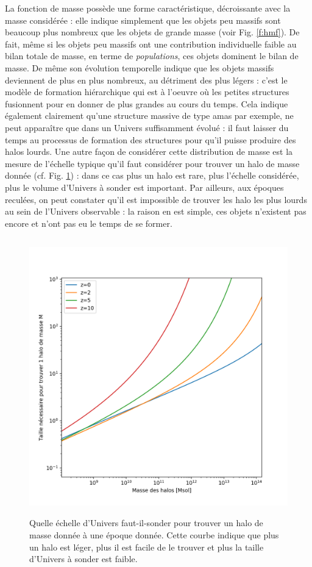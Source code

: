 La fonction de masse possède une forme caractéristique, décroissante avec la masse considérée : elle indique simplement que les objets peu massifs sont beaucoup plus nombreux que les objets de grande masse (voir Fig. \ref{f:hmf}). De fait, même si les objets peu massifs ont une contribution individuelle faible au bilan totale de masse, en terme de \textit{populations}, ces objets dominent le bilan de masse. De même son évolution temporelle indique que les objets massifs deviennent de plus en plus nombreux, au détriment des plus légers : c'est le modèle de formation hiérarchique qui est à l'oeuvre où les petites structures fusionnent pour en donner de plus grandes au cours du temps. Cela indique également clairement qu'une structure massive de type amas par exemple, ne peut apparaître que dans un Univers suffisamment évolué : il faut laisser du temps au processus de formation des structures pour qu'il puisse produire des halos lourds. Une autre façon de considérer cette distribution de masse est la mesure de l'échelle typique qu'il faut considérer pour trouver un halo de masse donnée (cf. Fig. \ref{f:L}) : dans ce cas plus un halo est rare, plus l'échelle considérée, plus le volume d'Univers à sonder est important. Par ailleurs, aux époques reculées, on peut constater qu'il est impossible de trouver les halo les plus lourds au sein de l'Univers observable : la raison en est simple, ces objets n'existent pas encore et n'ont pas eu le temps de se former.

\begin{figure}[htbp]
	\centering
		\includegraphics[height=12cm]{figs/L.png}
	\caption[Quelle échelle d'Univers faut-il-sonder pour trouver un halo de masse donnée à une époque donnée]{Quelle échelle d'Univers faut-il-sonder pour trouver un halo de masse donnée à une époque donnée. Cette courbe indique que plus un halo est léger, plus il est facile de le trouver et plus la taille d'Univers à sonder est faible.} 
	\label{f:L}
\end{figure}

